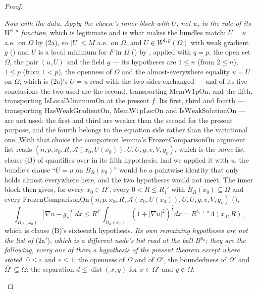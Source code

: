 \begin{proof}
\begin{enumerate}
  \emph{Now with the data.}  \emph{Apply the clause's inner block with $U$, not
  $u$, in the role of its
  $W^{1,p}$ function}, which is legitimate and is what makes the bundles match:
  $U=u$ a.e.\ on $\Omega$ by (2a), so $|U|\le M$ a.e.\ on $\Omega$, and
  $U\in W^{1,p}(\Omega)$ with weak gradient $g$ () and $U$ is
  a local minimum for $F$ in $\Omega$ () by
  , applied with $q=p$, the open set $\Omega$,
  the pair $(u,U)$ and the field $g$ --- its hypotheses are $1\le n$ (from
  $2\le n$), $1\le p$ (from $1<p$), the openness of $\Omega$ and the
  almost-everywhere equality $u=U$ on $\Omega$, which is (2a)'s $U=u$ read with
  the two sides exchanged --- and of its five conclusions the two used are the
  second, transporting $\mathrm{MemW1pOn}$, and the fifth, transporting
  $\mathrm{IsLocalMinimumOn}$ at the present $f$.  Its first, third and fourth
  --- transporting $\mathrm{HasWeakGradientOn}$, $\mathrm{MemW1pLocOn}$ and
  $\mathrm{IsWeakSolutionOn}$ --- are not used: the first and third are weaker
  than the second for the present purpose, and the fourth belongs to the
  equation side rather than the variational one.  With that choice the comparison
  lemma's
  $\mathrm{FrozenComparisonOn}$ argument list reads
  $(n,p,x_0,R,\mathcal A(x_0,U(x_0)),U,U,g,v,V,g_v)$, which is the \emph{same}
  list clause (B) of  quantifies over in
  its fifth hypothesis; had we applied it with $u$, the bundle's clause
  ``$U=u$ on $B_R(x_0)$'' would be a pointwise identity that only holds almost
  everywhere here, and the two hypotheses would not meet.  The inner block then
  gives, for every $x_0\in\Omega'$, every $0<R\le R_1'$ with
  $\overline B_R(x_0)\subseteq\Omega$ and every
  $\mathrm{FrozenComparisonOn}(n,p,x_0,R,\mathcal A(x_0,U(x_0)),U,U,g,v,V,g_v)$
  (),
  \[
  \int_{B_R(x_0)}|\nabla u-g_v|^p\,dx\le R^{\delta'}\!\int_{B_R(x_0)}(1+|\nabla
  u|^2)^{\frac p2}dx=R^{\delta_2+n}\Lambda(x_0,R),
  \]
  which is clause (B)'s sixteenth hypothesis.  \emph{Its own remaining
  hypotheses are \textup{not} the list of} (2a$'$), \emph{which is a different
  node's list read at the ball $B^{y_0}$; they are the following, every one of them a
  hypothesis of the present theorem except where stated.}
  $0\le\varepsilon$ and $\varepsilon\le1$; the openness of $\Omega$ and of
  $\Omega'$, the boundedness of $\Omega'$ and
  $\overline{\Omega'}\subseteq\Omega$; the separation
  $d\le\operatorname{dist}(x,y)$ for $x\in\Omega'$ and $y\notin\Omega$;

\end{enumerate}
\end{proof}
